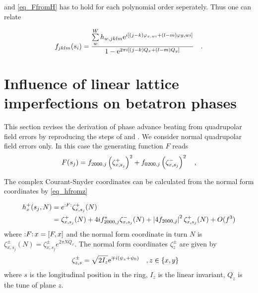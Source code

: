 and \eqref{eq_FfromH} has to hold for each polynomial order seperately. Thus one can relate 

\begin{equation}
    f_{jklm}(s_i)=\frac{
        \sum\limits_w^W h_{w,jklm} \text{e}^{i \left[ (j-k) \varphi_{x,wi} + (l-m)\varphi{y,wi} \right]}
    }{
        1-\text{e}^{2\pi i [(j-k)Q_x+(l-m)Q_y]}
    }
    \quad .
\end{equation}

\section{Influence of linear lattice imperfections on betatron phases}
\label{sec:deriv}
\label{sec_phase_beating}

This section revises the derivation of phase advance beating from quadrupolar field errors
by reproducing the steps of \cite{Franchi2014} and \cite{Franchi2016}. 
We consider normal quadrupolar
field errors only.
In this case the generating function $F$ reads
\begin{equation}
  F(s_j) = f_{2000,j} \left( \zeta_{x,s_j}^+ \right) ^2 + f_{0200,j} \left( \zeta_{x,s_j}^- \right)^2 \notag
  \quad ,
  \label{eq_F_quad}
\end{equation}

The complex Courant-Snyder coordinates can be calculated from the normal form coordinates by
\eqref{eq_hfromz}

\begin{align}
  h_x^+(s_j, N) &= e^{:F:}\zeta_{x,s_j}^+(N) \notag \\
  &= \zeta_{x,s_j}^+(N) + 4if_{2000,j}^* \zeta_{x,s_j}^-(N) 
  + \left| 4 f_{2000,j} \right|^2 \zeta_{x, s_j}^+(N) +
  O(f^3)
  \label{eq_h_2ndorder}
\end{align}
where ${:}F{:}\,x = [F,x]$ and the normal form coordinate in turn $N$ is
$ \zeta_{x,s_j}^\pm(N) = \zeta_{x,s_j}^\pm e^{2\pi NQ_x}$.
The normal form coordinates $\zeta_z^\pm$ are given by \cite{Tomas2005}
\begin{align}
  \zeta_{z,s}^{\pm} &=  \sqrt{2I_z}\text{e}^{\mp i\left( \psi_{z} + \psi_0 \right)}\quad,  z\in \{x,y\}
  \label{eq_normalformidentities}
\end{align}
where $s$ is the longitudinal position in the ring, $I_z$ is the linear
invariant, $Q_z$ is the tune of plane $z$.

